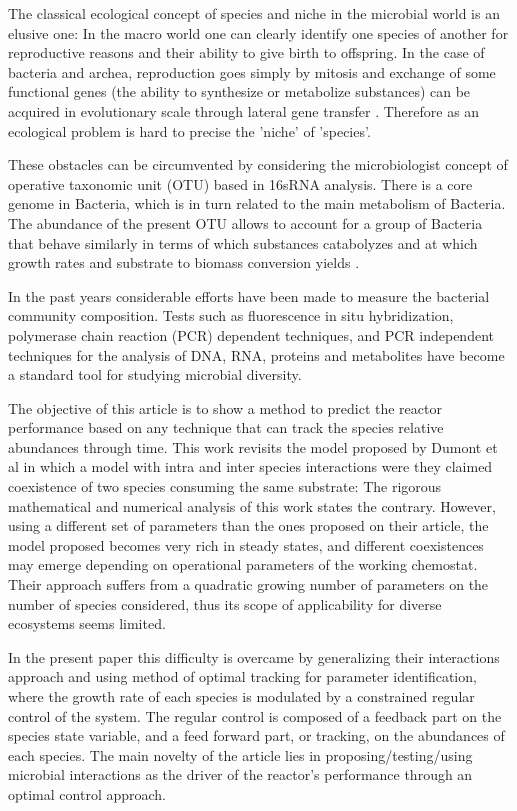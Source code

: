 \documentclass[3p,times]{elsarticle}
\begin{document}
The classical ecological concept of species and niche in the microbial world is an elusive one: In the macro world one can clearly identify one species of another for reproductive reasons and their ability to give birth to offspring. In the case of bacteria and archea, reproduction goes simply by mitosis and exchange of some functional genes (the ability to synthesize or metabolize substances) can be acquired in evolutionary scale through lateral gene transfer \cite{Boucher2003}. Therefore as an ecological problem is hard to precise the 'niche' of 'species'.

These obstacles can be circumvented by considering the microbiologist concept of operative taxonomic unit (OTU) based in 16sRNA analysis. There is a core genome in Bacteria, which is in turn related to the main metabolism of Bacteria. The abundance of the present OTU allows to account for a group of Bacteria that behave similarly in terms of which substances catabolyzes and at which growth rates and substrate to biomass conversion yields \cite{Muyzer1993}.

In the past years considerable efforts have been made to measure the bacterial community composition. Tests such as fluorescence in situ hybridization, polymerase chain reaction (PCR) dependent techniques, and PCR independent techniques for the analysis of DNA, RNA, proteins and metabolites have become a standard tool for studying  microbial diversity\cite{FERRERA2016790}. 

The objective of this article is to show a method to predict the reactor performance based on any technique that can track the species relative abundances through time. This work revisits the model proposed by Dumont et al \cite{Dumont2016} in which a model with intra and inter species interactions were they claimed coexistence of two species consuming the same substrate: The rigorous mathematical and numerical analysis of this work states the contrary. However, using a different set of parameters than the ones proposed on their article, the model proposed becomes very rich in steady states, and different coexistences may emerge depending on operational parameters of the working chemostat. Their approach suffers from a quadratic growing number of parameters on the number of species considered, thus its scope of applicability for diverse ecosystems seems limited. 

In the present paper this difficulty is overcame by generalizing their interactions approach and using method of optimal tracking for parameter identification, where the growth rate of each species is modulated by a constrained regular control of the system.  The regular control is composed of a feedback part on the species state variable, and a feed forward part, or tracking, on the abundances of each species. The main novelty of the article lies in proposing/testing/using microbial interactions as the driver of the reactor's performance  through an optimal control approach.
\end{document}
